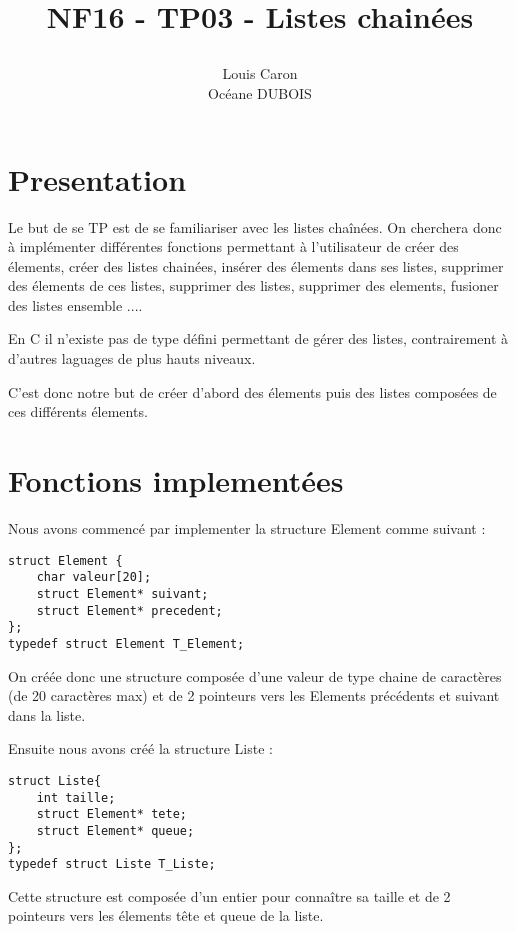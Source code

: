 \documentclass[11pt]{report}
\title{\textbf{NF16 - TP03 - Listes chainées}
\author{Louis Caron \\ Océane DUBOIS\\}
\date{}}
\begin{document}
\maketitle

\newpage

\section{Presentation}

Le but de se TP est de se familiariser avec les listes chaînées. On cherchera donc à implémenter différentes fonctions permettant à l'utilisateur de créer des élements, créer des listes chainées, insérer des élements dans ses listes, supprimer des élements de ces listes, supprimer des listes, supprimer des elements, fusioner des listes ensemble .... 

En C il n'existe pas de type défini permettant de gérer des listes, contrairement à d'autres laguages de plus hauts niveaux. 

C'est donc notre but de créer d'abord des élements puis des listes composées de ces différents élements.

\section{Fonctions implementées}

Nous avons commencé par implementer la structure Element comme suivant : 

\begin{lstlisting}
struct Element {
	char valeur[20];
	struct Element* suivant;
	struct Element* precedent;
};
typedef struct Element T_Element;
\end{lstlisting}
On créée donc une structure composée d'une valeur de type chaine de caractères (de 20 caractères max) et de 2 pointeurs vers les Elements précédents et suivant dans la liste.

Ensuite nous avons créé la structure Liste :

\begin{lstlisting}
struct Liste{
	int taille;
	struct Element* tete;
	struct Element* queue;
};
typedef struct Liste T_Liste;

\end{lstlisting}

Cette structure est composée d'un entier pour connaître sa taille et de 2 pointeurs vers les élements tête et queue de la liste. 
\end{document}
